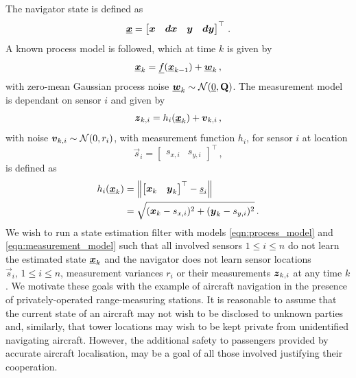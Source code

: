 \documentclass[twocolumn]{autart}
\begin{document}
The navigator state is defined as 
\begin{equation}
    {\boldsymbol{\underline{x}}} = 
    \begin{bmatrix}
        {\boldsymbol{x}} & {\boldsymbol{dx}} & {\boldsymbol{y}} & {\boldsymbol{dy}}
    \end{bmatrix}^\top\,. \label{eqn:state_def}
\end{equation}
A known process model is followed, which at time $k$ is given by
\begin{equation}
    {\boldsymbol{\underline{x}}}_k = {\underline{f}}({\boldsymbol{\underline{x}}}_{k-1})+{\boldsymbol{\underline{w}}}_k\,, \label{eqn:process_model}
\end{equation}
with zero-mean Gaussian process noise ${\boldsymbol{\underline{w}}}_k \sim \mathcal{N}({\underline{0}},{{\mathbf{Q}}})$. The measurement model is dependant on sensor $i$ and given by
\begin{equation}
    {\boldsymbol{z}}_{k,i} = h_i({\boldsymbol{\underline{x}}}_k)+{\boldsymbol{v}}_{k,i}\,, \label{eqn:measurement_model}
\end{equation}
with noise ${\boldsymbol{v}}_{k,i} \sim \mathcal{N}(0,r_i)$, with measurement function $h_i$, for sensor $i$ at location
\begin{equation}
    \vec{s}_i = 
    \begin{bmatrix}
        s_{x,i} & s_{y,i}
    \end{bmatrix}^\top\,,
\end{equation} 
is defined as
\begin{equation}
    \begin{split}
        h_i({\boldsymbol{\underline{x}}}_k) &= \left\lVert
        \begin{bmatrix}
            {\boldsymbol{x}}_k & {\boldsymbol{y}}_k
        \end{bmatrix}^\top
        - {\underline{s}}_{i}\right\rVert \\
        &= \sqrt{({\boldsymbol{x}}_k-s_{x,i})^2 + ({\boldsymbol{y}}_k-s_{y,i})^2}\,.
    \end{split}
\end{equation}
We wish to run a state estimation filter with models \eqref{eqn:process_model} and \eqref{eqn:measurement_model} such that all involved sensors $1 \leq i \leq n$ do not learn the estimated state ${\boldsymbol{\underline{x}}}_k$ and the navigator does not learn sensor locations $\vec{s}_i,\,1 \leq i \leq n$, measurement variances $r_i$ or their measurements ${\boldsymbol{z}}_{k,i}$ at any time $k$. We motivate these goals with the example of aircraft navigation in the presence of privately-operated range-measuring stations. It is reasonable to assume that the current state of an aircraft may not wish to be disclosed to unknown parties and, similarly, that tower locations may wish to be kept private from unidentified navigating aircraft. However, the additional safety to passengers provided by accurate aircraft localisation, may be a goal of all those involved justifying their cooperation.
\end{document}
